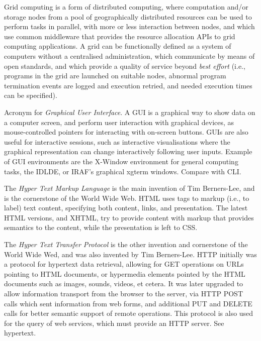{
		Grid computing is a form of distributed computing, where
        computation and/or storage nodes from a pool of geographically
        distributed resources can be used to perform tasks in parallel,
        with more or less interaction between nodes, and which use
        common \gls{middleware} that provides the resource allocation
        \gls{API}s to grid computing applications. A grid can be
        functionally defined as a system of computers without a
        centralised administration, which communicate by means of open
        standards, and which provide a quality of service beyond
        \emph{best effort} (i.e., programs in the grid are launched on
        suitable nodes, abnormal program termination events are logged
        and execution retried, and needed execution times can be
        specified).
}

{
    	Acronym for \emph{Graphical User Interface}. A GUI is a
        graphical way to show data on a computer screen, and perform
        user interaction with graphical devices, as mouse-controlled
        pointers for interacting with on-screen buttons. GUIs are also
        useful for \gls{interactive sessions}, such as interactive
        visualisations where the graphical representation can change
        interactively following user inputs. Example of GUI
        environments are the X-Window environment for general computing
        tasks, the IDLDE, or IRAF's graphical xgterm windows. Compare
        with \gls{CLI}.
}

{
    	The \emph{Hyper Text Markup Language} is the main invention of
        Tim Berners-Lee, and is the cornerstone of the \gls{World Wide
        Web}. HTML uses \gls{tags} to markup (i.e., to label) text
        content, specifying both content, links, and presentation. The
        latest HTML versions, and \gls{XHTML}, try to provide content
        with markup that provides semantics to the content, while the
        presentation is left to CSS.
}

{
    	The \emph{Hyper Text Transfer Protocol} is the other invention
        and cornerstone of the \gls{World Wide Wed}, and was also
        invented by Tim Berners-Lee. HTTP initially was a protocol for
        hypertext data retrieval, allowing for GET operations on
        \gls{URL}s pointing to HTML documents, or hypermedia elements
        pointed by the HTML documents such as images, sounds, videos,
        et cetera.
		It was later upgraded to allow information transport from
        the browser to the server, via HTTP POST calls which sent
        information from web forms, and additional PUT and DELETE calls
        for better semantic support of remote operations. This protocol
        is also used for the query of web services, which must provide
        an HTTP server.
}
{
    	See \gls{hypertext}.
}

